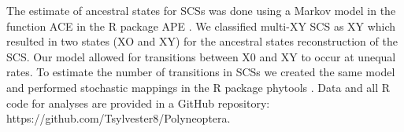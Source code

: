 The estimate of ancestral states for SCSs was done using a Markov model in the function ACE in the R package APE \citep{Paradis2018}.
We classified multi-XY SCS as XY which resulted in two states (XO and XY) for the ancestral states reconstruction of the SCS. 
Our model allowed for transitions between X0 and XY to occur at unequal rates.
To estimate the number of transitions in SCSs we created the same model and performed stochastic mappings in the R package phytools \citep{revell2012phytools}.
Data and all R code for analyses are provided in a GitHub repository: https://github.com/Tsylvester8/Polyneoptera. 

